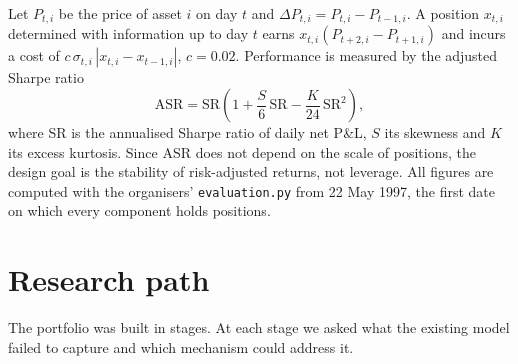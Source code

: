 \documentclass[10.5pt,a4paper]{article}
\begin{document}
Let $P_{t,i}$ be the price of asset $i$ on day $t$ and $\Delta P_{t,i}=P_{t,i}-P_{t-1,i}$. A position $x_{t,i}$ determined with information up to day $t$ earns $x_{t,i}(P_{t+2,i}-P_{t+1,i})$ and incurs a cost of $c\,\sigma_{t,i}\,|x_{t,i}-x_{t-1,i}|$, $c=0.02$. Performance is measured by the adjusted Sharpe ratio
\begin{equation}
\mathrm{ASR}=\mathrm{SR}\left(1+\frac{S}{6}\,\mathrm{SR}-\frac{K}{24}\,\mathrm{SR}^2\right),
\end{equation}
where SR is the annualised Sharpe ratio of daily net P\&L, $S$ its skewness and $K$ its excess kurtosis. Since ASR does not depend on the scale of positions, the design goal is the stability of risk-adjusted returns, not leverage. All figures are computed with the organisers' \texttt{evaluation.py} from 22 May 1997, the first date on which every component holds positions.

\section{Research path}
The portfolio was built in stages. At each stage we asked what the existing model failed to capture and which mechanism could address it.
\end{document}

